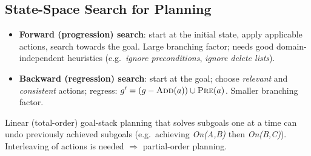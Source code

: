 \subsection{State-Space Search for Planning}
\begin{itemize}
\item \textbf{Forward (progression) search}: start at the initial state, apply applicable actions, search towards the goal. Large branching factor; needs good domain-independent heuristics (e.g.\ \emph{ignore preconditions}, \emph{ignore delete lists}).
\item \textbf{Backward (regression) search}: start at the goal; choose \emph{relevant} and \emph{consistent} actions; regress: $g'=(g-\textsc{Add}(a))\cup\textsc{Pre}(a)$. Smaller branching factor.
\end{itemize}
\begin{caution}
Linear (total-order) goal-stack planning that solves subgoals one at a time can undo previously achieved subgoals (e.g.\ achieving \textit{On(A,B)} then \textit{On(B,C)}). Interleaving of actions is needed $\Rightarrow$ partial-order planning.
\end{caution}

